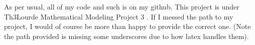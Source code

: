 \documentclass[12pt]{article} %
\begin{document}
As per usual, all of my code and such is on my github. This project is under Th3Lourde Mathematical Modeling Project 3 . If I messed the path to my project, I would of course be more than happy to provide the correct one. (Note the path provided is missing some underscores due to how latex handles them).
\end{document}
